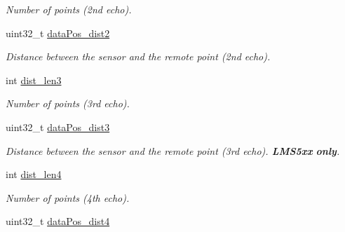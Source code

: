 \begin{DoxyCompactItemize}
\begin{DoxyCompactList}\small\item\em Number of points (2nd echo). \end{DoxyCompactList}\item 
\hypertarget{structpacpus_1_1SickLMS__dbt_a405a50a42f60b5f3452b45433ee397f4}{uint32\-\_\-t \hyperlink{structpacpus_1_1SickLMS__dbt_a405a50a42f60b5f3452b45433ee397f4}{data\-Pos\-\_\-dist2}}\label{structpacpus_1_1SickLMS__dbt_a405a50a42f60b5f3452b45433ee397f4}

\begin{DoxyCompactList}\small\item\em Distance between the sensor and the remote point (2nd echo). \end{DoxyCompactList}\item 
\hypertarget{structpacpus_1_1SickLMS__dbt_aa457a25a6b3511055bbdbc34a1a9f5e2}{int \hyperlink{structpacpus_1_1SickLMS__dbt_aa457a25a6b3511055bbdbc34a1a9f5e2}{dist\-\_\-len3}}\label{structpacpus_1_1SickLMS__dbt_aa457a25a6b3511055bbdbc34a1a9f5e2}

\begin{DoxyCompactList}\small\item\em Number of points (3rd echo). \end{DoxyCompactList}\item 
\hypertarget{structpacpus_1_1SickLMS__dbt_afaea29ff718ae370c1ddc03170bf2d58}{uint32\-\_\-t \hyperlink{structpacpus_1_1SickLMS__dbt_afaea29ff718ae370c1ddc03170bf2d58}{data\-Pos\-\_\-dist3}}\label{structpacpus_1_1SickLMS__dbt_afaea29ff718ae370c1ddc03170bf2d58}

\begin{DoxyCompactList}\small\item\em Distance between the sensor and the remote point (3rd echo). {\bfseries L\-M\-S5xx} {\bfseries only}. \end{DoxyCompactList}\item 
\hypertarget{structpacpus_1_1SickLMS__dbt_a2c9ed5c2a00dd9f367011da96135a7d3}{int \hyperlink{structpacpus_1_1SickLMS__dbt_a2c9ed5c2a00dd9f367011da96135a7d3}{dist\-\_\-len4}}\label{structpacpus_1_1SickLMS__dbt_a2c9ed5c2a00dd9f367011da96135a7d3}

\begin{DoxyCompactList}\small\item\em Number of points (4th echo). \end{DoxyCompactList}\item 
\hypertarget{structpacpus_1_1SickLMS__dbt_a5ead9c1691285121f3f5dc4c9678779e}{uint32\-\_\-t \hyperlink{structpacpus_1_1SickLMS__dbt_a5ead9c1691285121f3f5dc4c9678779e}{data\-Pos\-\_\-dist4}}\label{structpacpus_1_1SickLMS__dbt_a5ead9c1691285121f3f5dc4c9678779e}


\end{DoxyCompactItemize}
